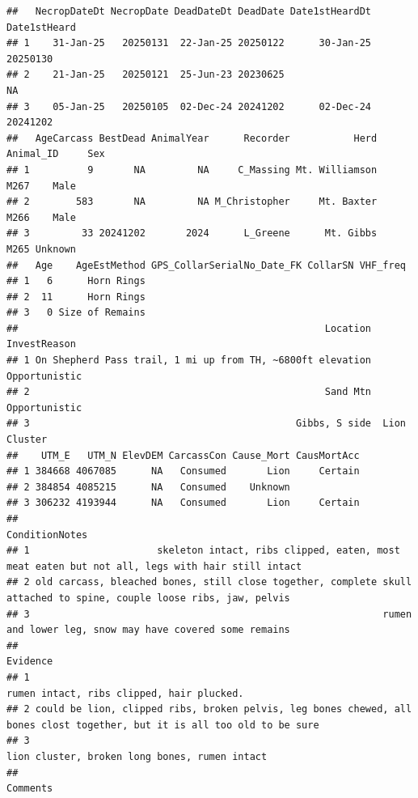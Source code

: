 \documentclass[
]{book}
\begin{document}
\begin{verbatim}
##   NecropDateDt NecropDate DeadDateDt DeadDate Date1stHeardDt Date1stHeard
## 1    31-Jan-25   20250131  22-Jan-25 20250122      30-Jan-25     20250130
## 2    21-Jan-25   20250121  25-Jun-23 20230625                          NA
## 3    05-Jan-25   20250105  02-Dec-24 20241202      02-Dec-24     20241202
##   AgeCarcass BestDead AnimalYear      Recorder           Herd Animal_ID     Sex
## 1          9       NA         NA     C_Massing Mt. Williamson      M267    Male
## 2        583       NA         NA M_Christopher     Mt. Baxter      M266    Male
## 3         33 20241202       2024      L_Greene      Mt. Gibbs      M265 Unknown
##   Age    AgeEstMethod GPS_CollarSerialNo_Date_FK CollarSN VHF_freq
## 1   6      Horn Rings                                             
## 2  11      Horn Rings                                             
## 3   0 Size of Remains                                             
##                                                     Location  InvestReason
## 1 On Shepherd Pass trail, 1 mi up from TH, ~6800ft elevation Opportunistic
## 2                                                   Sand Mtn Opportunistic
## 3                                              Gibbs, S side  Lion Cluster
##    UTM_E   UTM_N ElevDEM CarcassCon Cause_Mort CausMortAcc
## 1 384668 4067085      NA   Consumed       Lion     Certain
## 2 384854 4085215      NA   Consumed    Unknown            
## 3 306232 4193944      NA   Consumed       Lion     Certain
##                                                                                                        ConditionNotes
## 1                      skeleton intact, ribs clipped, eaten, most meat eaten but not all, legs with hair still intact
## 2 old carcass, bleached bones, still close together, complete skull attached to spine, couple loose ribs, jaw, pelvis
## 3                                                             rumen and lower leg, snow may have covered some remains
##                                                                                                                   Evidence
## 1                                                                                rumen intact, ribs clipped, hair plucked.
## 2 could be lion, clipped ribs, broken pelvis, leg bones chewed, all bones clost together, but it is all too old to be sure
## 3                                                                            lion cluster, broken long bones, rumen intact
##                                                                                                                                                                                                                                                                                                          Comments

\end{verbatim}
\end{document}
